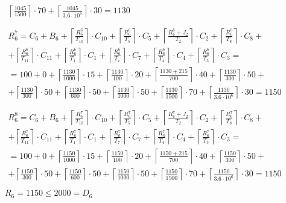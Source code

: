 \begin{gather*}
\begin{multlined}
    \left\lceil\frac{1045}{1500}\right\rceil\cdot 70 +%
    \left\lceil\frac{1045}{3.6 \cdot 10^6}\right\rceil\cdot 30 = 1130 \\
  \end{multlined} \\
  \begin{multlined}
    R_6^7 = C_6 + B_6 + \left\lceil\frac{R_6^6}{T_{10}}\right\rceil\cdot C_{10} + %
    \left\lceil\frac{R_6^6}{T_5}\right\rceil\cdot C_5 + %
    \left\lceil\frac{R_6^6 + J_2}{T_2}\right\rceil\cdot C_2 + %
    \left\lceil\frac{R_6^6}{T_8}\right\rceil\cdot C_8 + \\%
    + \left\lceil\frac{R_6^6}{T_{11}}\right\rceil\cdot C_{11} + %
    \left\lceil\frac{R_6^6}{T_1}\right\rceil\cdot C_1 +%
    \left\lceil\frac{R_6^6}{T_7}\right\rceil\cdot C_7 +%
    \left\lceil\frac{R_6^6}{T_4}\right\rceil\cdot C_4 +%
    \left\lceil\frac{R_6^6}{T_3}\right\rceil\cdot C_3 = \\%
    = 100 + 0 + \left\lceil\frac{1130}{1000}\right\rceil\cdot 15 + %
    \left\lceil\frac{1130}{100}\right\rceil\cdot 20 + %
    \left\lceil\frac{1130 + 215}{700}\right\rceil\cdot 40 + %
    \left\lceil\frac{1130}{300}\right\rceil\cdot 50 + \\%
    + \left\lceil\frac{1130}{300}\right\rceil\cdot 50 + %
    \left\lceil\frac{1130}{600}\right\rceil\cdot 50 + %
    \left\lceil\frac{1130}{1000}\right\rceil\cdot 50 +%
    \left\lceil\frac{1130}{1500}\right\rceil\cdot 70 +%
    \left\lceil\frac{1130}{3.6 \cdot 10^6}\right\rceil\cdot 30 = 1150 \\
  \end{multlined} \\
  \begin{multlined}
    R_6^8 = C_6 + B_6 + \left\lceil\frac{R_6^7}{T_{10}}\right\rceil\cdot C_{10} + %
    \left\lceil\frac{R_6^7}{T_5}\right\rceil\cdot C_5 + %
    \left\lceil\frac{R_6^7 + J_2}{T_2}\right\rceil\cdot C_2 + %
    \left\lceil\frac{R_6^7}{T_8}\right\rceil\cdot C_8 + \\%
    + \left\lceil\frac{R_6^7}{T_{11}}\right\rceil\cdot C_{11} + %
    \left\lceil\frac{R_6^7}{T_1}\right\rceil\cdot C_1 +%
    \left\lceil\frac{R_6^7}{T_7}\right\rceil\cdot C_7 +%
    \left\lceil\frac{R_6^7}{T_4}\right\rceil\cdot C_4 +%
    \left\lceil\frac{R_6^7}{T_3}\right\rceil\cdot C_3 = \\%
    = 100 + 0 + \left\lceil\frac{1150}{1000}\right\rceil\cdot 15 + %
    \left\lceil\frac{1150}{100}\right\rceil\cdot 20 + %
    \left\lceil\frac{1150 + 215}{700}\right\rceil\cdot 40 + %
    \left\lceil\frac{1150}{300}\right\rceil\cdot 50 + \\%
    + \left\lceil\frac{1150}{300}\right\rceil\cdot 50 + %
    \left\lceil\frac{1150}{600}\right\rceil\cdot 50 + %
    \left\lceil\frac{1150}{1000}\right\rceil\cdot 50 +%
    \left\lceil\frac{1150}{1500}\right\rceil\cdot 70 +%
    \left\lceil\frac{1150}{3.6 \cdot 10^6}\right\rceil\cdot 30 = 1150 \\
  \end{multlined} \\
  R_6 = 1150 \le 2000 = D_6
\end{gather*}

